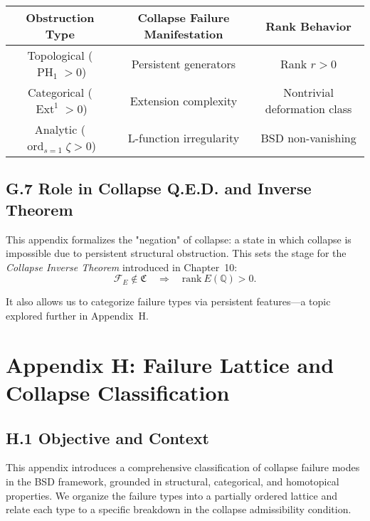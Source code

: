 \documentclass[11pt]{article}
\DeclareMathOperator{\Ext}{Ext}
\DeclareMathOperator{\PH}{PH}
\newcommand{\ord}{\operatorname{ord}}
\begin{document}
\begin{center}
\begin{tabular}{|c|c|c|}
\hline
\textbf{Obstruction Type} & \textbf{Collapse Failure Manifestation} & \textbf{Rank Behavior} \\
\hline
Topological (\( \PH_1 > 0 \)) & Persistent generators & Rank \( r > 0 \) \\
Categorical (\( \Ext^1 > 0 \)) & Extension complexity & Nontrivial deformation class \\
Analytic (\( \ord_{s=1} \zeta > 0 \)) & L-function irregularity & BSD non-vanishing \\
\hline
\end{tabular}
\end{center}

\subsection*{G.7 Role in Collapse Q.E.D. and Inverse Theorem}

This appendix formalizes the "negation" of collapse: a state in which collapse is impossible due to persistent structural obstruction.  
This sets the stage for the \emph{Collapse Inverse Theorem} introduced in Chapter~10:
\[
\mathcal{F}_E \notin \mathfrak{C} \quad \Rightarrow \quad \mathrm{rank}~E(\mathbb{Q}) > 0.
\]

It also allows us to categorize failure types via persistent features—a topic explored further in Appendix~H.



\appendix
\section*{Appendix H: Failure Lattice and Collapse Classification}

\subsection*{H.1 Objective and Context}

This appendix introduces a comprehensive classification of collapse failure modes in the BSD framework, grounded in structural, categorical, and homotopical properties. We organize the failure types into a partially ordered lattice and relate each type to a specific breakdown in the collapse admissibility condition.
\end{document}
